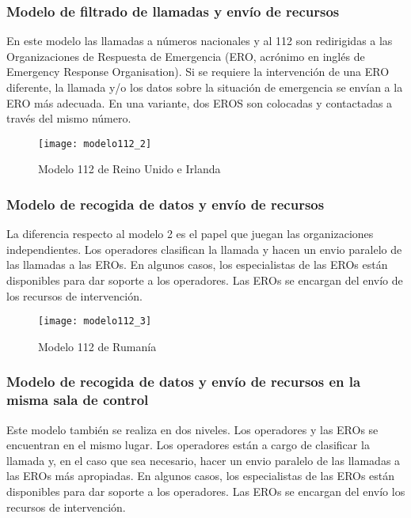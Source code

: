 \subsubsection{Modelo de filtrado de llamadas y envío de recursos}

En este modelo las llamadas a números nacionales y al 112 son redirigidas a las  Organizaciones de Respuesta de Emergencia (ERO, acrónimo en inglés de Emergency Response Organisation). Si se requiere la intervención de una ERO diferente, la llamada y/o los datos sobre la situación de emergencia se envían a la ERO más adecuada. En una variante, dos EROS son colocadas y contactadas a través del mismo número.

\begin{figure}[htp!]
  \centering
  \texttt{[image: modelo112\_2]}
  \caption{Modelo 112 de Reino Unido e Irlanda}
  \label{fig:modelo112_2}
\end{figure}

\subsubsection{Modelo de recogida de datos y envío de recursos}

La diferencia respecto al modelo 2 es el papel que juegan las organizaciones independientes. Los operadores clasifican la llamada y hacen un envio paralelo de las llamadas a las EROs. En algunos casos, los especialistas de las EROs están disponibles para dar soporte a los operadores. Las EROs se encargan del envío de los recursos de intervención.

\begin{figure}[htp!]
  \centering
  \texttt{[image: modelo112\_3]}
  \caption{Modelo 112 de Rumanía}
  \label{fig:modelo112_3}
\end{figure}

\subsubsection{Modelo de recogida de datos y envío de recursos en la misma sala de control}

Este modelo también se realiza en dos niveles. Los operadores y las EROs se encuentran en el mismo lugar. Los operadores están a cargo de clasificar la llamada y, en el caso que sea necesario, hacer un envio paralelo de las llamadas a las EROs más apropiadas. En algunos casos, los especialistas de las EROs están disponibles para dar soporte a los operadores. Las EROs se encargan del envío los recursos de intervención.

